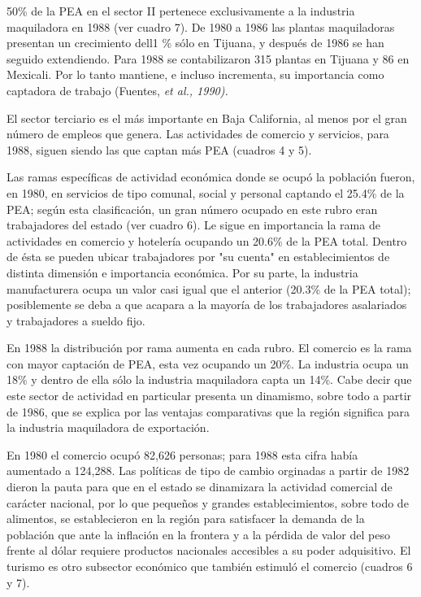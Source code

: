 \documentclass{article}
\begin{document}
50\% de la PEA en el sector II pertenece exclusivamente a la industria maquiladora en 1988 (ver cuadro 7). De 1980 a 1986 las plantas maquiladoras presentan un crecimiento dell1 \% sólo en Tijuana, y después de 1986 se han seguido extendiendo. Para 1988 se contabilizaron 315 plantas en Tijuana y 86 en Mexicali. Por lo tanto mantiene, e incluso incrementa, su importancia como captadora de trabajo (Fuentes, \textit{et al., 1990).}

El sector terciario es el más importante en Baja California, al menos por el gran número de empleos que genera. Las actividades de comercio y servicios, para 1988, siguen siendo las que captan más PEA (cuadros 4 y 5).

Las ramas específicas de actividad económica donde se ocupó la población fueron, en 1980, en servicios de tipo comunal, social y personal captando el 25.4\% de la PEA; según esta clasificación, un gran número ocupado en este rubro eran trabajadores del estado (ver cuadro 6). Le sigue en importancia la rama de actividades en comercio y hotelería ocupando un 20.6\% de la PEA total. Dentro de ésta se pueden ubicar trabajadores por "su cuenta" en establecimientos de distinta dimensión e importancia económica. Por su parte, la industria manufacturera ocupa un valor casi igual que el anterior (20.3\% de la PEA total); posiblemente se deba a que acapara a la mayoría de los trabajadores asalariados y trabajadores a sueldo fijo.

En 1988 la distribución por rama aumenta en cada rubro. El comercio es la rama con mayor captación de PEA, esta vez ocupando un 20\%. La industria ocupa un 18\% y dentro de ella sólo la industria maquiladora capta un 14\%. Cabe decir que este sector de actividad en particular presenta un dinamismo, sobre todo a partir de 1986, que se explica por las ventajas comparativas que la región significa para la industria maquiladora de exportación.

En 1980 el comercio ocupó 82,626 personas; para 1988 esta cifra había aumentado a 124,288. Las políticas de tipo de cambio orginadas a partir de 1982 dieron la pauta para que en el estado se dinamizara la actividad comercial de carácter nacional, por lo que pequeños y grandes establecimientos, sobre todo de alimentos, se establecieron en la región para satisfacer la demanda de la población que ante la inflación en la frontera y a la pérdida de valor del peso frente al dólar requiere productos nacionales accesibles a su poder adquisitivo. El turismo es otro subsector económico que también estimuló el comercio (cuadros 6 y 7).
\end{document}

